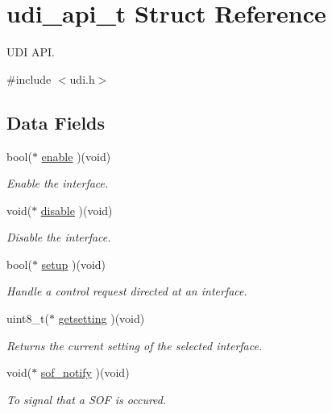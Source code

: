 \hypertarget{structudi__api__t}{
\section{udi\-\_\-api\-\_\-t \-Struct \-Reference}
\label{structudi__api__t}
}


\-U\-D\-I \-A\-P\-I.  




{\ttfamily \#include $<$udi.\-h$>$}

\subsection*{\-Data \-Fields}
\begin{DoxyCompactItemize}
\item 
bool($\ast$ \hyperlink{structudi__api__t_a293117d7192553f153e0411b346dadc1}{enable} )(void)
\begin{DoxyCompactList}\small\item\em \-Enable the interface. \end{DoxyCompactList}\item 
void($\ast$ \hyperlink{structudi__api__t_ab0ceaf0d506a357091ec69d5868bff7d}{disable} )(void)
\begin{DoxyCompactList}\small\item\em \-Disable the interface. \end{DoxyCompactList}\item 
bool($\ast$ \hyperlink{structudi__api__t_a8161cf3c75c90f630f7d1ee931be821d}{setup} )(void)
\begin{DoxyCompactList}\small\item\em \-Handle a control request directed at an interface. \end{DoxyCompactList}\item 
uint8\-\_\-t($\ast$ \hyperlink{structudi__api__t_ad2b798a7cb160d55ed92162ecb845f97}{getsetting} )(void)
\begin{DoxyCompactList}\small\item\em \-Returns the current setting of the selected interface. \end{DoxyCompactList}\item 
void($\ast$ \hyperlink{structudi__api__t_ab1dc2a8393441c196b1f5a93e9535f8e}{sof\-\_\-notify} )(void)
\begin{DoxyCompactList}\small\item\em \-To signal that a \-S\-O\-F is occured. \end{DoxyCompactList}\end{DoxyCompactItemize}


